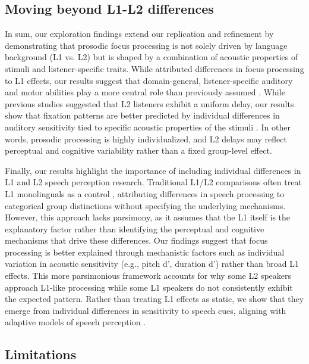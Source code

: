 \subsection{Moving beyond L1-L2 differences}

In sum, our exploration findings extend our replication and refinement by demonstrating that prosodic focus processing is not solely driven by language background (L1 vs. L2) but is shaped by a combination of acoustic properties of stimuli and listener-specific traits. While \textcite{ge2021a} attributed differences in focus processing to L1 effects, our results suggest that domain-general, listener-specific auditory and motor abilities play a more central role than previously assumed \parencite{saito2022does, bramlett_wiener_24_speechprosody, bakkouche2025effects, Kachlicka_Saito_Tierney_2019}. While previous studies suggested that L2 listeners exhibit a uniform delay, our results show that fixation patterns are better predicted by individual differences in auditory sensitivity tied to specific acoustic properties of the stimuli \parencite{xie2023adaptive}. In other words, prosodic processing is highly individualized, and L2 delays may reflect perceptual and cognitive variability rather than a fixed group-level effect. 

Finally, our results highlight the importance of including individual differences in L1 and L2 speech perception research. Traditional L1/L2 comparisons often treat L1 monolinguals as a control \parencite{rothman2023monolingual}, attributing differences in speech processing to categorical group distinctions without specifying the underlying mechanisms. However, this approach lacks parsimony, as it assumes that the L1 itself is the explanatory factor rather than identifying the perceptual and cognitive mechanisms that drive these differences. Our findings suggest that focus processing is better explained through mechanistic factors such as individual variation in acoustic sensitivity (e.g., pitch d$’$, duration d$’$) rather than broad L1 effects. This more parsimonious framework accounts for why some L2 speakers approach L1-like processing while some L1 speakers do not consistently exhibit the expected pattern. Rather than treating L1 effects as static, we show that they emerge from individual differences in sensitivity to speech cues, aligning with adaptive models of speech perception \parencite{xie2023adaptive}. 


\subsection{Limitations}

